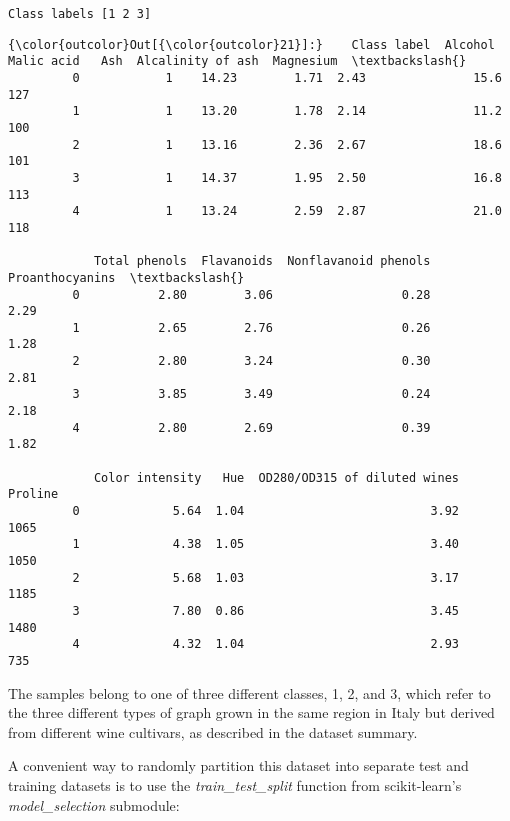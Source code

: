 \documentclass[11pt]{article}
\begin{document}
    \begin{Verbatim}[commandchars=\\\{\}]
Class labels [1 2 3]

    \end{Verbatim}

\begin{Verbatim}[commandchars=\\\{\}]
{\color{outcolor}Out[{\color{outcolor}21}]:}    Class label  Alcohol  Malic acid   Ash  Alcalinity of ash  Magnesium  \textbackslash{}
         0            1    14.23        1.71  2.43               15.6        127   
         1            1    13.20        1.78  2.14               11.2        100   
         2            1    13.16        2.36  2.67               18.6        101   
         3            1    14.37        1.95  2.50               16.8        113   
         4            1    13.24        2.59  2.87               21.0        118   
         
            Total phenols  Flavanoids  Nonflavanoid phenols  Proanthocyanins  \textbackslash{}
         0           2.80        3.06                  0.28             2.29   
         1           2.65        2.76                  0.26             1.28   
         2           2.80        3.24                  0.30             2.81   
         3           3.85        3.49                  0.24             2.18   
         4           2.80        2.69                  0.39             1.82   
         
            Color intensity   Hue  OD280/OD315 of diluted wines  Proline  
         0             5.64  1.04                          3.92     1065  
         1             4.38  1.05                          3.40     1050  
         2             5.68  1.03                          3.17     1185  
         3             7.80  0.86                          3.45     1480  
         4             4.32  1.04                          2.93      735  
\end{Verbatim}
            
    The samples belong to one of three different classes, 1, 2, and 3, which
refer to the three different types of graph grown in the same region in
Italy but derived from different wine cultivars, as described in the
dataset summary.

    A convenient way to randomly partition this dataset into separate test
and training datasets is to use the \emph{train\_test\_split} function
from scikit-learn's \emph{model\_selection} submodule:
\end{document}
